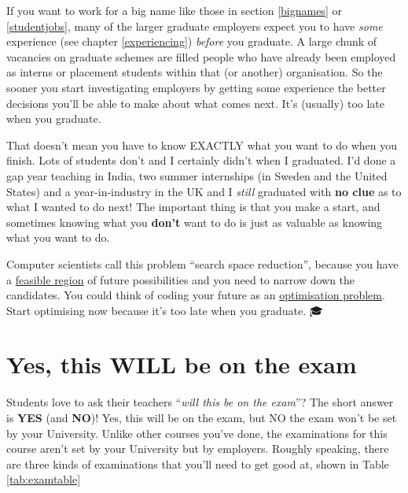 \documentclass[
]{book}
\begin{document}
If you want to work for a big name like those in section \ref{bignames} or \ref{studentjobs}, many of the larger graduate employers expect you to have \emph{some} experience (see chapter \ref{experiencing}) \emph{before} you graduate. A large chunk of vacancies on graduate schemes are filled people who have already been employed as interns or placement students within that (or another) organisation. So the sooner you start investigating employers by getting some experience the better decisions you'll be able to make about what comes next. It's (usually) too late when you graduate.

That doesn't mean you have to know EXACTLY what you want to do when you finish. Lots of students don't and I certainly didn't when I graduated. I'd done a gap year teaching in India, two summer internships (in Sweden and the United States) and a year-in-industry in the UK and I \emph{still} graduated with \textbf{no clue} as to what I wanted to do next! The important thing is that you make a start, and sometimes knowing what you \textbf{don't} want to do is just as valuable as knowing what you want to do.

Computer scientists call this problem ``search space reduction'', \citep{searchspace} because you have a \href{https://en.wikipedia.org/wiki/Feasible_region}{feasible region} of future possibilities and you need to narrow down the candidates. You could think of coding your future as an \href{https://en.wikipedia.org/wiki/Optimization_problem}{optimisation problem}. Start optimising now because it's too late when you graduate. 🎓

\hypertarget{exams}{%
\section{Yes, this WILL be on the exam}\label{exams}}

Students love to ask their teachers ``\emph{will this be on the exam}''? The short answer is \textbf{YES} (and \textbf{NO})! Yes, this will be on the exam, but NO the exam won't be set by your University. Unlike other courses you've done, the examinations for this course aren't set by your University but by employers. Roughly speaking, there are three kinds of examinations that you'll need to get good at, shown in Table \ref{tab:examtable}
\end{document}
